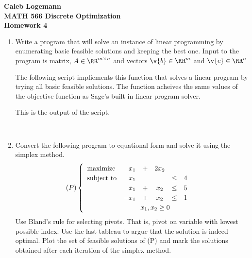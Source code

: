 \documentclass[11pt, oneside]{article}
\begin{document}
\noindent \textbf{\Large{Caleb Logemann \\
MATH 566 Discrete Optimization\\
Homework 4
}}

%
\begin{enumerate}
  \item %
    Write a program that will solve an instance of linear programming by
    enumerating basic feasible solutions and keeping the best one.
    Input to the program is matrix, $A \in \RR^{m \times n}$ and vectors
    $\v{b} \in \RR^m$ and $\v{c} \in \RR^n$

    The following script impliements this function that solves a linear
    program by trying all basic feasible solutions.
    The function acheives the same values of the objective function as Sage's
    built in linear program solver.
    
    This is the output of the script.
    \begin{verbatim}
        
    \end{verbatim}

  \item %
    Convert the following program to equational form and solve it using the
    simplex method.
    \[
      (P) 
      \begin{cases} 
        \begin{array}{lrccccc} 
          \text{maximize}    &x_1  &+  &2x_2 &     &   \\
          \text{subject to}  &x_1  &   &     &\leq & 4 \\
                             &x_1  &+  &x_2  &\leq & 5 \\
                             &-x_1 &+  &x_2  &\leq & 1 \\
        \end{array}\\
        \text{ \hskip 8em } x_1,x_2 \geq 0
      \end{cases}
    \]
    Use Bland's rule for selecting pivots.
    That is, pivot on variable with lowest possible index.
    Use the last tableau to argue that the solution is indeed optimal.
    Plot the set of feasible solutions of (P) and mark the solutions obtained
    after each iteration of the simplex method.


\end{enumerate}
\end{document}
